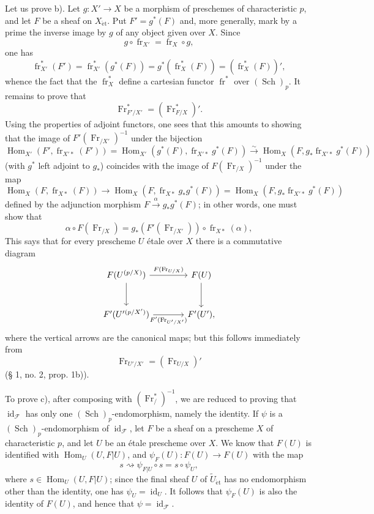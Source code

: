 \documentclass[11pt]{article}
\DeclareMathOperator{\Hom}{Hom}
\providecommand{\et}{\mathrm{\acute{e}t}}
\providecommand{\id}{\operatorname{id}}
\providecommand{\Hom}{\operatorname{Hom}}
\providecommand{\id}{\operatorname{id}}
\providecommand{\id}{\operatorname{id}}
\providecommand{\id}{\operatorname{id}}
\providecommand{\id}{\operatorname{id}}
\providecommand{\Hom}{\operatorname{Hom}}
\providecommand{\fr}{\operatorname{fr}}
\providecommand{\Fr}{\operatorname{Fr}}
\providecommand{\Sch}{\operatorname{Sch}}
\providecommand{\Fr}{\operatorname{Fr}}
\providecommand{\fr}{\operatorname{fr}}
\providecommand{\Sch}{\operatorname{Sch}}
\providecommand{\id}{\operatorname{id}}
\providecommand{\et}{\acute{e}t}
\begin{document}
Let us prove b). Let $g:X'\to X$ be a morphism of preschemes of characteristic $p$, and let $F$ be a sheaf on $X_{\et}$. Put $F'=g^*(F)$ and, more generally, mark by a prime the inverse image by $g$ of any object given over $X$. Since
\[
g\circ\fr_{X'}=\fr_X\circ g,
\]
one has
\[
\fr_{X'}^*(F')=\fr_{X'}^*(g^*(F))=g^*(\fr_X^*(F))=(\fr_X^*(F))',
\]
whence the fact that the $\fr_X^*$ define a cartesian functor $\fr^*$ over $(\Sch)_p$. It remains to prove that
\[
\Fr^*_{F'/X'}=(\Fr^*_{F/X})'.
\]
Using the properties of adjoint functors, one sees that this amounts to showing that the image of $F'(\Fr_{/X'})^{-1}$ under the bijection
\[
\Hom_{X'}(F',\fr_{X'*}(F'))
 =\Hom_{X'}(g^*(F),\fr_{X'*}g^*(F))
 \xrightarrow{\sim} \Hom_X(F,g_*\fr_{X'*}g^*(F))
\]
(with $g^*$ left adjoint to $g_*$) coincides with the image of $F(\Fr_{/X})^{-1}$ under the map
\[
\Hom_X(F,\fr_{X*}(F))\longrightarrow
\Hom_X(F,\fr_{X*}g_*g^*(F))=
\Hom_X(F,g_*\fr_{X'*}g^*(F))
\]
defined by the adjunction morphism $F\xrightarrow{\alpha}g_*g^*(F)$; in other words, one must show that
\[
\alpha\circ F(\Fr_{/X})=g_*(F'(\Fr_{/X'}))\circ\fr_{X*}(\alpha),
\]
This says that for every prescheme $U$ étale over $X$ there is a commutative diagram
\[
\begin{tikzcd}[column sep=large,row sep=large]
F(U^{(p/X)}) \arrow[r,"F(\Fr_{U/X})"] \arrow[d]
& F(U) \arrow[d]\\
F'(U'{}^{(p/X')}) \arrow[r,"F'(\Fr_{U'/X'})"']
& F'(U') ,
\end{tikzcd}
\]
where the vertical arrows are the canonical maps; but this follows immediately from
\[
\Fr_{U'/X'}=(\Fr_{U/X})'
\]
(§ 1, no. 2, prop. 1b)).

To prove c), after composing with $(\Fr^*_{/})^{-1}$, we are reduced to proving that $\id_{\mathcal F}$ has only one $(\Sch)_p$-endomorphism, namely the identity. If $\psi$ is a $(\Sch)_p$-endomorphism of $\id_{\mathcal F}$, let $F$ be a sheaf on a prescheme $X$ of characteristic $p$, and let $U$ be an étale prescheme over $X$. We know that $F(U)$ is identified with $\Hom_U(U,F|U)$, and $\psi_F(U):F(U)\to F(U)$ with the map
\[
s\rightsquigarrow \psi_{F|U}\circ s=s\circ\psi_U,
\]
where $s\in\Hom_U(U,F|U)$; since the final sheaf $U$ of $\widetilde U_{\et}$ has no endomorphism other than the identity, one has $\psi_U=\id_U$. It follows that $\psi_F(U)$ is also the identity of $F(U)$, and hence that $\psi=\id_{\mathcal F}$.
\end{document}

